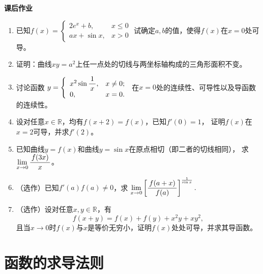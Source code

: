 \begin{ext}
	{\centering\bf 课后作业}
	
	\begin{enumerate}  
	  \item 已知$f(x)=\left\{\begin{array}{ll}
		2e^x+b,& x\leq0\\ ax+\sin x,& x> 0
		\end{array}\right.$
		试确定$a,b$的值，使得$f(x)$在$x=0$处可导。
	  \item 证明：曲线$xy=a^2$上任一点处的切线与两坐标轴构成的三角形面积不变。
	  \item 讨论函数
	  	$y=\left\{\begin{array}{ll}
	    	x^2\sin\displaystyle\frac{\,{1}\,}{\,{x}\,},& x\ne0;\\ 0, & x=0.
	    \end{array}\right.$
	  在$x=0$处的连续性、可导性以及导函数的连续性。
	  \item 设对任意$x\in\mathbb{R}$，均有$f(x+2)=f(x)$，已知$f'(0)=1$，
	  证明$f(x)$在$x=2$可导，并求$f'(2)$。
	  \item 已知曲线$y=f(x)$和曲线$y=\sin x$在原点相切（即二者的切线相同），
	  求$\lim\limits_{x\to{0}}\displaystyle\frac{\,{f(3x)}\,}{\,{x}\,}$。
	  \item （选作）已知$f'(a)f(a)\ne 0$，求
	  $\lim\limits_{x\to{0}}\left[\displaystyle\frac{\,{f(a+x)}\,}{\,{f(a)}\,}\right]^{\frac1{\sin x}}.$
	  \item （选作）设对任意$x,y\in\mathbb{R}$，有
	  $$f(x+y)=f(x)+f(y)+x^2y+xy^2,$$
	  且当$x\to0$时$f(x)$与$x$是等价无穷小，证明$f(x)$处处可导，并求其导函数。
	\end{enumerate}
\end{ext}

\section{函数的求导法则}

